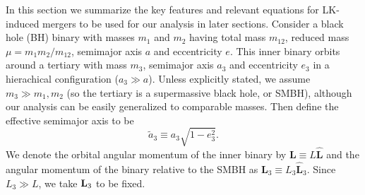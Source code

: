\documentclass[
        twocolumn,
        twocolappendix
    ]{aastex63}
\renewcommand*{\bm}[1]{\boldsymbol{\mathbf{#1}}}
\newcommand*{\uv}[1]{\hat{\bm{#1}}}
\begin{document}
In this section we summarize the key features and relevant equations for
LK-induced mergers to be used for our analysis in later sections. Consider a
black hole (BH) binary with masses $m_1$ and $m_2$ having total mass $m_{12}$,
reduced mass $\mu = m_1 m_2 / m_{12}$, semimajor axis $a$ and eccentricity $e$.
This inner binary orbits around a tertiary with mass $m_3$, semimajor axis $a_3$
and eccentricity $e_3$ in a hierachical configuration ($a_3\gg a$). Unless
explicitly stated, we assume $m_3 \gg m_1, m_2$ (so the tertiary is a
supermassive black hole, or SMBH), although our analysis can be easily
generalized to comparable masses. Then define the effective semimajor axis to be
\begin{equation}
    \tilde{a}_3 \equiv a_3\sqrt{1 - e_3^2}.
\end{equation}
We denote the orbital angular momentum of the inner binary by $\bm{L} \equiv L
\uv{L}$ and the angular momentum of the binary relative to the SMBH as $\bm{L}_3
\equiv L_3 \uv{L}_3$. Since $L_3 \gg L$, we take $\bm{L}_{\rm 3}$ to be fixed.
\end{document}
